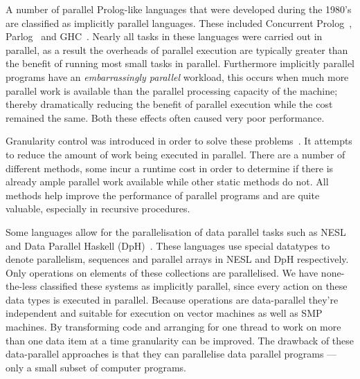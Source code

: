 A number of parallel Prolog-like languages that were developed during the
1980's are classified as implicitly parallel languages.
These included Concurrent
Prolog~\citep{saraswat85:probl_with_concur_prolog,saraswat86:concurrent_prolog_definition,shapiro:flat_concur_prolog},
Parlog~\citep{clark:84:parlog_sys_prog,clark:86:parlog} and GHC~\citep{ueda:ghc}.
Nearly all tasks in these languages were carried out in
parallel,
as a result the overheads of parallel execution are typically
greater than the benefit of running most small tasks in parallel.
Furthermore implicitly parallel programs have an \emph{embarrassingly
  parallel} workload,
this occurs when much more parallel work is available than the parallel
processing capacity of the machine;
thereby dramatically reducing the benefit of parallel execution while
the cost remained the same.
Both these effects often caused very poor performance.

Granularity control was introduced in order to solve these
problems~\citep{lopez96:distance_granularity,shen_98_granularity-control}.
It attempts to reduce the amount of work being executed in parallel.
There are a number of different methods, some incur a
runtime cost in order to determine if there is already ample parallel
work available while other static methods do not.
All methods help improve the performance of parallel programs and are
quite valuable, especially in recursive procedures.

Some languages allow for the parallelisation of data parallel
tasks such as NESL~\citep{blelloch:95:nesl} and Data Parallel
Haskell (DpH)~\citep{dph:2007:status_report,dph:2008:harnessing_the_multicores}.
These languages use special datatypes to denote parallelism,
sequences and parallel arrays in NESL and DpH respectively.
Only operations on elements of these collections are parallelised.
We have none-the-less classified these systems as implicitly parallel,
since every action on these data types is executed in parallel.
Because operations are data-parallel they're independent and suitable
for execution on vector machines as well as SMP machines.
By transforming code and arranging for one thread to work on more than
one data item at a time granularity can be improved.
The drawback of these data-parallel approaches is that they can
parallelise data parallel programs
--- only a small subset of computer programs.

